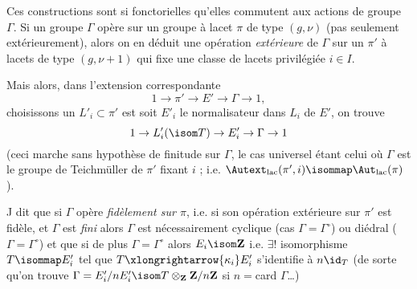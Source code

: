 Ces constructions sont si fonctorielles qu'elles commutent aux actions de groupe $\Gamma$. Si un groupe $\Gamma$ opère sur un groupe à lacet $\pi$ de type $(g, \nu)$ (pas seulement extérieurement), alors on en déduit une opération \emph{extérieure} de $\Gamma$ sur un $\pi'$ à lacets de type $(g, \nu + 1)$ qui fixe une classe de lacets privilégiée $i \in I$.

Mais alors, dans l'extension correspondante
$$
1 \to \pi' \to E' \to \Gamma \to 1,
$$
choisissons un $L'_i \subset  \pi'$ est soit $E'_i$ le normalisateur dans $L_i$ de $E'$, on trouve
$$
1 \to L'_i (\isom T) \to E'_i \to \Gamma \to 1
$$
(ceci marche sans hypothèse de finitude sur $\Gamma$, le cas universel étant celui où $\Gamma$ est le groupe de Teichmüller de $\pi'$ fixant $i$ ; i.e. $\Autext_{\text{lac}}(\pi', i) \isommap \Aut_{\text{lac}}(\pi)$).

J dit que si $\Gamma$ opère \emph{fidèlement sur $\pi$}, i.e. si son opération extérieure sur $\pi'$ est fidèle, et $\Gamma$ est \emph{fini} alors $\Gamma$ est nécessairement cyclique (cas $\Gamma = \Gamma^\circ$) ou diédral ($\Gamma = \Gamma^\circ$) et que si de plus $\Gamma = \Gamma^\circ$ alors $E_i \isom \mathbf{Z}$ i.e. $\exists !$ isomorphisme $T \isommap E'_i$ tel que $T \xlongrightarrow{\kappa_i} E'_i$ s'identifie à $n \id_T$ (de sorte qu'on trouve $\Gamma = E'_i / nE'_i \isom T \otimes_{\mathbf{Z}} \mathbf{Z}/n\mathbf{Z}$ si $n = $card $\Gamma$\dots)

